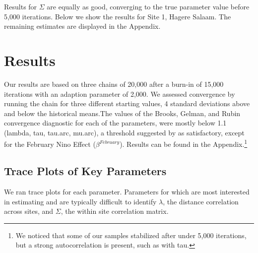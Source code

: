 \documentclass[12pt]{article}
\begin{document}
Results for $\Sigma$ are equally as good, converging to the true parameter value before 5,000 iterations. Below we show the results for Site 1, Hagere Salaam. The remaining estimates are displayed in the Appendix. 




\section{Results}
\label{sec:results}
Our results are based on three chains of 20,000 after a burn-in of 15,000 iterations with an adaption parameter of 2,000. We assessed convergence by running the chain for three different starting values, 4 standard deviations above and below the historical means.The values of the Brooks, Gelman, and Rubin convergence diagnostic for each of the parameters, were mostly below 1.1 (lambda, tau, tau.arc, mu.arc), a threshold suggested by \citet{Gamerman1997} as satisfactory, except for the February Nino Effect ($\beta^{February}$). Results can be found in the Appendix.\footnote{We noticed that some of our samples stabilized after under 5,000 iterations, but a strong autocorrelation is present, such as with tau.}  



\subsection{Trace Plots of Key Parameters}



We ran trace plots for each parameter. Parameters for which are most interested in estimating and are typically difficult to identify $\lambda$, the distance correlation across sites, and $\Sigma$, the within site correlation matrix. 
\end{document}
